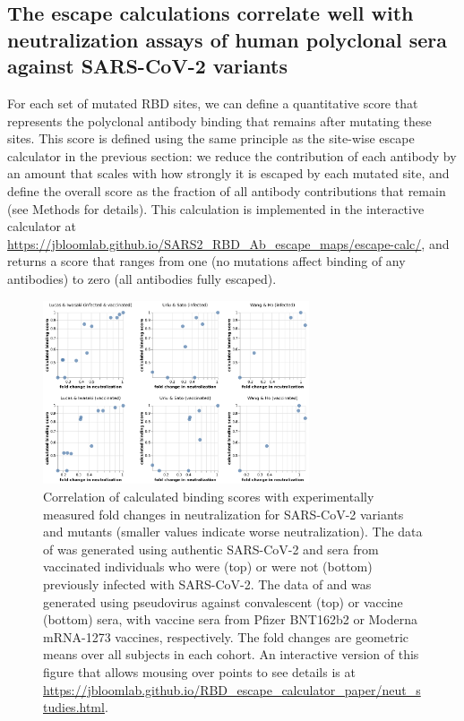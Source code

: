 \documentclass[9pt,twocolumn,twoside]{gsajnl_modified}
\begin{document}
\subsection{The escape calculations correlate well with neutralization assays of human polyclonal sera against SARS-CoV-2 variants}
For each set of mutated RBD sites, we can define a quantitative score that represents the polyclonal antibody binding that remains after mutating these sites.
This score is defined using the same principle as the site-wise escape calculator in the previous section: we reduce the contribution of each antibody by an amount that scales with how strongly it is escaped by each mutated site, and define the overall score as the fraction of all antibody contributions that remain (see Methods for details).
This calculation is implemented in the interactive calculator at \url{https://jbloomlab.github.io/SARS2_RBD_Ab_escape_maps/escape-calc/}, and returns a score that ranges from one (no mutations affect binding of any antibodies) to zero (all antibodies fully escaped).

\begin{figure}
\includegraphics[width=0.7\textwidth]{../results/neut_studies/neut_studies.png}
\caption{Correlation of calculated binding scores with experimentally measured fold changes in neutralization for SARS-CoV-2 variants and mutants (smaller values indicate worse neutralization).
The data of \citet{lucas2021impact} was generated using authentic SARS-CoV-2 and sera from vaccinated individuals who were (top) or were not (bottom) previously infected with SARS-CoV-2.
The data of \citet{uriu2021neutralization} and \citet{wang2021antibody} was generated using pseudovirus against convalescent (top) or vaccine (bottom) sera, with vaccine sera from Pfizer BNT162b2 or Moderna mRNA-1273 vaccines, respectively. 
The fold changes are geometric means over all subjects in each cohort.
An interactive version of this figure that allows mousing over points to see details is at \url{https://jbloomlab.github.io/RBD_escape_calculator_paper/neut_studies.html}.
}
\label{fig:neut_studies}
\end{figure}
\end{document}
